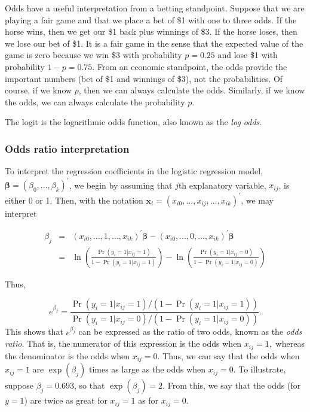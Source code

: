 Odds have a useful interpretation from a betting standpoint. Suppose that we
are playing a fair game and that we place a bet of \$1 with one to three
odds. If the horse wins, then we get our \$1 back plus winnings of \$3. If
the horse loses, then we lose our bet of \$1. It is a fair game in the sense
that the expected value of the game is zero because we win \$3 with
probability $p=0.25$ and lose \$1 with probability $1-p=0.75$. From an
economic standpoint, the odds provide the important numbers (bet of \$1 and
winnings of \$3), not the probabilities. Of course, if we know $p$, then we
can always calculate the odds. Similarly, if we know the odds, we can always
calculate the probability $p$.

The logit is the logarithmic odds function, also known as the
\emph{log odds}.

\subsubsection*{Odds ratio interpretation}

To interpret the regression coefficients in the logistic regression model, $%
\boldsymbol \beta=(\beta_0,\ldots ,\beta_{k})^{\prime}$, we begin by
assuming that $j$th explanatory variable, $x_{ij}$, is either 0 or
1. Then, with the notation $\mathbf{x}_i=(x_{i0},...,x_{ij},\ldots
,x_{ik})^{\prime}$, we may interpret

\begin{eqnarray*}
\beta_j &=&(x_{i0},...,1,\ldots ,x_{ik})^{\prime}\boldsymbol \beta%
-(x_{i0},...,0,\ldots ,x_{ik})^{\prime}\boldsymbol \beta \\
&=&\ln \left( \frac{\Pr (y_i=1|x_{ij}=1)}{1-\Pr
(y_i=1|x_{ij}=1)}\right) -\ln \left( \frac{\Pr
(y_i=1|x_{ij}=0)}{1-\Pr (y_i=1|x_{ij}=0)}\right)
\end{eqnarray*}

Thus,

\begin{equation*}
e^{\beta_j}=\frac{\Pr (y_i=1|x_{ij}=1)/\left( 1-\Pr
(y_i=1|x_{ij}=1)\right) }{\Pr (y_i=1|x_{ij}=0)/\left( 1-\Pr
(y_i=1|x_{ij}=0)\right) }.
\end{equation*}
This shows that $e^{\beta_j}$ can be expressed as the ratio of two
odds, known as the \emph{odds ratio}. That is, the numerator of this
expression is the odds when $x_{ij}=1,$ whereas the denominator is
the odds when $x_{ij}=0$. Thus, we can say that the odds when
$x_{ij}=1$ are $\exp (\beta_j)$ times as large as the odds when
$x_{ij}=0$. To illustrate, suppose $\beta_j=0.693$, so that $\exp
(\beta _j)=2$. From this, we say that the odds (for $y=1$) are twice
as great for $x_{ij}=1$ as for $x_{ij}=0$.

